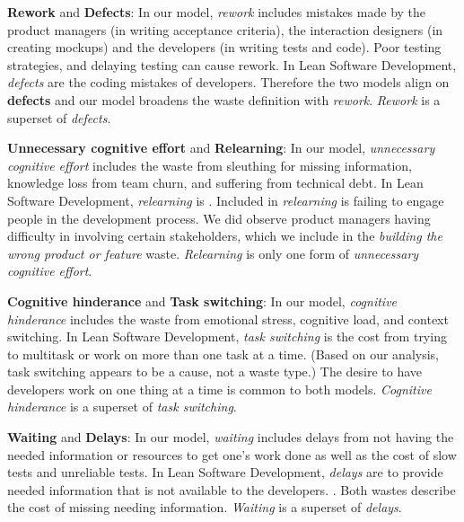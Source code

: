 
\textbf{Rework} and \textbf{Defects}: In our model, \textit{rework} includes mistakes made by the product managers (in writing acceptance criteria), the interaction designers (in creating mockups) and the developers (in writing tests and code). Poor testing strategies, and delaying testing can cause rework. In Lean Software Development, \textit{defects} are the coding mistakes of developers. Therefore the two models align on \textbf{defects} and our model broadens the waste definition with \textit{rework}. \textit{Rework} is a superset of \textit{defects}. 

\textbf{Unnecessary cognitive effort} and \textbf{Relearning}: In our model, \textit{unnecessary cognitive effort} includes the waste from sleuthing for missing information, knowledge loss from team churn, and suffering from technical debt. In Lean Software Development, \textit{relearning} is  \cite{PoppendieckConceptToCash}. Included in \textit{relearning} is failing to engage people in the development process. We did observe product managers having difficulty in involving certain stakeholders, which we include in the \textit{building the wrong product or feature} waste. \textit{Relearning} is only one form of \textit{unnecessary cognitive effort}.

\textbf{Cognitive hinderance} and \textbf{Task switching}: In our model, \textit{cognitive hinderance} includes the waste from emotional stress, cognitive load, and context switching. In Lean Software Development, \textit{task switching} is the cost from trying to multitask or work on more than one task at a time. (Based on our analysis, task switching appears to be a cause, not a waste type.) The desire to have developers work on one thing at a time is common to both models. \textit{Cognitive hinderance} is a superset of \textit{task switching}.  

\textbf{Waiting} and \textbf{Delays}: In our model, \textit{waiting} includes delays from not having the needed information or resources to get one's work done as well as the cost of slow tests and unreliable tests. In Lean Software Development, \textit{delays} are  to provide needed information that is not available to the developers. \cite{PoppendieckConceptToCash}. Both wastes describe the cost of missing needing information. \textit{Waiting} is a superset of \textit{delays}.
